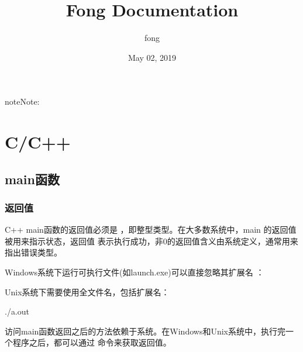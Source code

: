 \documentclass[letterpaper,10pt,english]{sphinxmanual}
\title{Fong Documentation}
\date{May 02, 2019}
\author{fong}
\begin{document}
\maketitle
\sphinxtableofcontents
{}\label{\detokenize{index::doc}}


\begin{sphinxadmonition}{note}{Note:}


\end{sphinxadmonition}


\chapter{C/C++}
\label{\detokenize{cpp/index:c-c}}\label{\detokenize{cpp/index::doc}}\label{\detokenize{cpp/index:id1}}

\section{main函数}
\label{\detokenize{cpp/01_main:main}}\label{\detokenize{cpp/01_main::doc}}

\subsection{返回值}
\label{\detokenize{cpp/01_main:id1}}
C++ main函数的返回值必须是  ，即整型类型。在大多数系统中，main 的返回值被用来指示状态，返回值  表示执行成功，非0的返回值含义由系统定义，通常用来指出错误类型。

Windows系统下运行可执行文件(如launch.exe)可以直接忽略其扩展名  ：

%
\begin{sphinxVerbatim}[commandchars=\\\{\}]
\end{sphinxVerbatim}

Unix系统下需要使用全文件名，包括扩展名：

%
\begin{sphinxVerbatim}[commandchars=\\\{\}]
./a.out
\end{sphinxVerbatim}

访问main函数返回之后的方法依赖于系统。在Windows和Unix系统中，执行完一个程序之后，都可以通过  命令来获取返回值。
\end{document}
